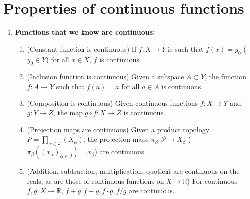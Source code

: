 \documentclass[letterpaper, 12pt]{book}
\newcommand{\RR}{\mathbb{R}}
\newcommand{\ms}[1]{\mathscr{#1}}
\begin{document}
\section{Properties of continuous functions}
    \begin{enumerate}[resume]
    \item \textbf{Functions that we know are continuous:}
        \begin{enumerate}
        \item (Constant function is continuous) If $f:X\to Y$ is such that $f(x) = y_0$ ($y_0\in Y$) for all $x\in X$, $f$ is continuous.
        \item (Inclusion function is continuous) Given a subspace $A\subset Y$, the function $f:A\to Y$ such that $f(a) = a$ for all $a\in A$ is continuous.
        \item (Composition is continuous) Given continuous functions $f:X\to Y$ and $g:Y\to Z$, the map $g\circ f : X\to Z$ is continuous.
        \item (Projection maps are continuous) Given a product topology $P = \prod_{\alpha\in J}(X_\alpha)$, the projection maps $\pi_\beta : \ms{P} \to X_\beta$ ($\pi_\beta((x_\alpha)_{\alpha\in J}) = x_\beta$) are continuous.
        \item (Addition, subtraction, multiplication, quotient are continuous on the reals, as are those of continuous functions on $X\to \RR$) For continuous $f,g:X\to\RR$, $f+g, f-g, f\cdot g, f/g$ are continuous.


\end{enumerate}
\end{enumerate}
\end{document}
